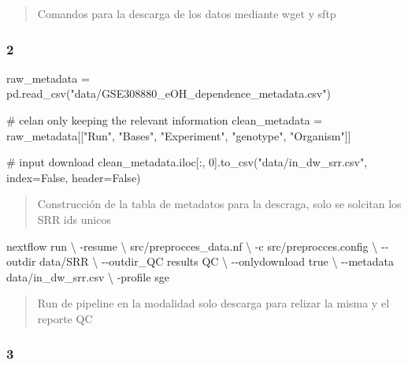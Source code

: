 \documentclass[
  9pt,
]{article}
\newenvironment{Shaded}{\begin{snugshade}}{\end{snugshade}}
\newcommand{\NormalTok}[1]{\textcolor[rgb]{0.00,0.23,0.31}{#1}}
\begin{document}
\begin{quote}
Comandos para la descarga de los datos mediante wget y sftp
\end{quote}

\subsubsection{2}\label{section-1}

\begin{Shaded}
\begin{Highlighting}[]
\NormalTok{raw\_metadata = pd.read\_csv("data/GSE308880\_eOH\_dependence\_metadata.csv")}

\NormalTok{\# celan only keeping the relevant information}
\NormalTok{clean\_metadata = raw\_metadata[["Run", "Bases", "Experiment", "genotype", "Organism"]]}

\NormalTok{\# input download}
\NormalTok{clean\_metadata.iloc[:, 0].to\_csv("data/in\_dw\_srr.csv", index=False, header=False)}
\end{Highlighting}
\end{Shaded}

\begin{quote}
Construcción de la tabla de metadatos para la descraga, solo se solcitan
los SRR ids unicos
\end{quote}

\begin{Shaded}
\begin{Highlighting}[]

\NormalTok{nextflow run \textbackslash{}}
\NormalTok{    {-}resume \textbackslash{}}
\NormalTok{    src/preprocces\_data.nf \textbackslash{}}
\NormalTok{    {-}c src/preprocces.config \textbackslash{}}
\NormalTok{    {-}{-}outdir data/SRR \textbackslash{}}
\NormalTok{    {-}{-}outdir\_QC results QC \textbackslash{}}
\NormalTok{    {-}{-}onlydownload true \textbackslash{}}
\NormalTok{    {-}{-}metadata data/in\_dw\_srr.csv \textbackslash{}}
\NormalTok{    {-}profile sge}
\end{Highlighting}
\end{Shaded}

\begin{quote}
Run de pipeline en la modalidad solo descarga para relizar la misma y el
reporte QC
\end{quote}

\subsubsection{3}\label{section-2}
\end{document}
